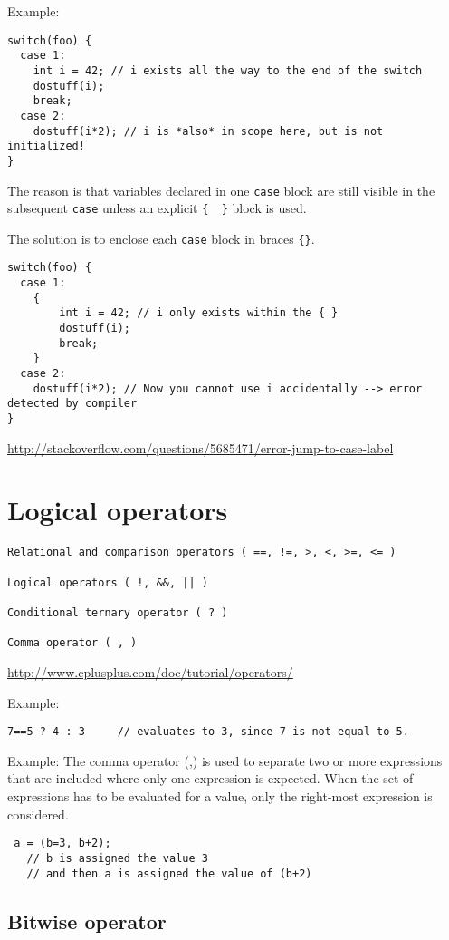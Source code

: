 Example: 
\begin{verbatim}
switch(foo) {
  case 1:
    int i = 42; // i exists all the way to the end of the switch
    dostuff(i);
    break;
  case 2:
    dostuff(i*2); // i is *also* in scope here, but is not initialized!
}
\end{verbatim}
The reason is that variables declared in one \verb!case! block are still visible 
in the subsequent \verb!case! unless an explicit \verb!{  }! block is used.

The solution is to enclose each \verb!case! block in braces \verb!{}!.
\begin{verbatim}
switch(foo) {
  case 1:
    {
        int i = 42; // i only exists within the { }
        dostuff(i);
        break;
    }
  case 2:
    dostuff(i*2); // Now you cannot use i accidentally --> error detected by compiler
}
\end{verbatim}

\url{http://stackoverflow.com/questions/5685471/error-jump-to-case-label}

\section{Logical operators}

\begin{verbatim}
Relational and comparison operators ( ==, !=, >, <, >=, <= )

Logical operators ( !, &&, || )

Conditional ternary operator ( ? )

Comma operator ( , )
\end{verbatim}
\url{http://www.cplusplus.com/doc/tutorial/operators/}

Example:
\begin{verbatim}
7==5 ? 4 : 3     // evaluates to 3, since 7 is not equal to 5.
\end{verbatim}

Example: The comma operator (,) is used to separate two or more expressions that
are included where only one expression is expected. When the set of expressions
has to be evaluated for a value, only the right-most expression is considered.  
\begin{verbatim}
 a = (b=3, b+2);
   // b is assigned the value 3
   // and then a is assigned the value of (b+2)
\end{verbatim}

\subsection{Bitwise operator}


